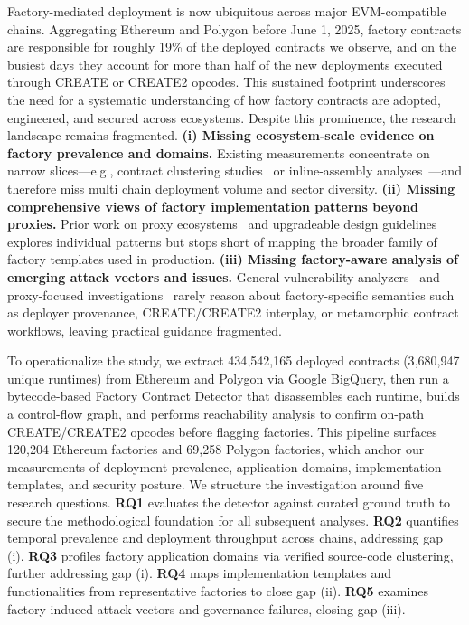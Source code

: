 \documentclass[acmsmall, screen]{acmart}
\begin{document}
	Factory-mediated deployment is now ubiquitous across major EVM-compatible chains. Aggregating
	Ethereum and Polygon before June 1, 2025, factory contracts are responsible for roughly 19\% of
	the deployed contracts we observe, and on the busiest days they account for more than half of the
	new deployments executed through CREATE or CREATE2 opcodes. This sustained footprint underscores the
	need for a systematic understanding of how factory contracts are adopted, engineered, and secured
	across ecosystems. Despite
	this prominence, the research landscape remains fragmented. \textbf{(i) Missing ecosystem-scale
	evidence on factory prevalence and domains.} Existing measurements concentrate on narrow
	slices—e.g., contract clustering studies~\cite{DBLP:conf/sigsoft/SunXLLL23,DBLP:conf/fc/FrowisB22,DBLP:conf/fc/SalehiCM22}
or inline-assembly analyses~\cite{DBLP:journals/pacmpl/ChaliasosGL22}—and therefore miss multi chain
deployment volume and sector diversity. \textbf{(ii) Missing comprehensive views of factory
	implementation patterns beyond proxies.} Prior work on proxy ecosystems~\cite{DBLP:conf/uss/BodellMD23,proxy-empirical-ecosystem}
	and upgradeable design guidelines~\cite{eip-1014,eip-1167,eip-2470,eip-3171} explores individual
	patterns but stops short of mapping the broader family of factory templates used in production.
	\textbf{(iii) Missing factory-aware analysis of emerging attack vectors and issues.} General vulnerability
	analyzers~\cite{DBLP:conf/pldi/BrentGLSS20,DBLP:conf/kbse/XueMLSYP20,DBLP:conf/issta/GhalebRP22,DBLP:conf/issta/LiaoZCN22,DBLP:conf/uss/0001L21}
	and proxy-focused investigations~\cite{DBLP:conf/fc/SalehiCM22,DBLP:conf/uss/BodellMD23} rarely reason
	about factory-specific semantics such as deployer provenance, CREATE/CREATE2 interplay, or metamorphic
	contract workflows, leaving practical guidance fragmented.

	To operationalize the study, we extract 434{,}542{,}165 deployed contracts (3{,}680{,}947 unique
	runtimes) from Ethereum and Polygon via Google BigQuery, then run a bytecode-based Factory
	Contract Detector that disassembles each runtime, builds a control-flow graph, and performs
	reachability analysis to confirm on-path CREATE/CREATE2 opcodes before flagging factories. This pipeline
	surfaces 120{,}204 Ethereum factories and 69{,}258 Polygon factories, which anchor our
	measurements of deployment prevalence, application domains, implementation templates, and security
	posture. We structure the investigation around five research questions. \textbf{RQ1} evaluates
	the detector against curated ground truth to secure the methodological foundation for all
	subsequent analyses. \textbf{RQ2} quantifies temporal prevalence and deployment throughput
	across chains, addressing gap (i). \textbf{RQ3} profiles factory application domains via verified
	source-code clustering, further addressing gap (i). \textbf{RQ4} maps implementation templates
	and functionalities from representative factories to close gap (ii). \textbf{RQ5} examines
	factory-induced attack vectors and governance failures, closing gap (iii).
\end{document}
